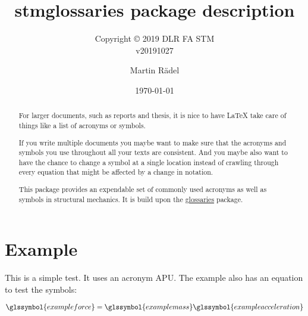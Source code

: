 \documentclass{scrartcl}
\author{Martin R\"{a}del}
\title{stmglossaries package description}
\subtitle{Copyright \copyright{} 2019 DLR FA STM\\v20191027}
\date{\today}
\begin{document}
\maketitle

\begin{abstract}
For larger documents, such as reports and thesis, it is nice to have \LaTeX{} take care of things like a list of acronyms or symbols.

If you write multiple documents you maybe want to make sure that the acronyms and symbols you use throughout all your texts are consistent. And you maybe also want to have the chance to change a symbol at a single location instead of crawling through every equation that might be affected by a change in notation.

This package provides an expendable set of commonly used acronyms as well as symbols in structural mechanics. It is build upon the \href{https://ctan.org/pkg/glossaries?lang=en}{glossaries} package.
\end{abstract}

\tableofcontents

\section{Example}

This is a simple test. It uses an acronym \gls{APU}. The example also has an equation to test the symbols:


\begin{equation}  
\glssymbol{exampleforce} = \glssymbol{examplemass}\glssymbol{exampleacceleration}
\end{equation}

% 
% 
\end{document}
